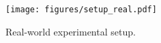 
\begin{figure}[t]
\centering
\texttt{[image: figures/setup\_real.pdf]}
\caption{Real-world experimental setup.
\vspace{-0.4cm}
}
\label{fig:setup:real}
\end{figure}
